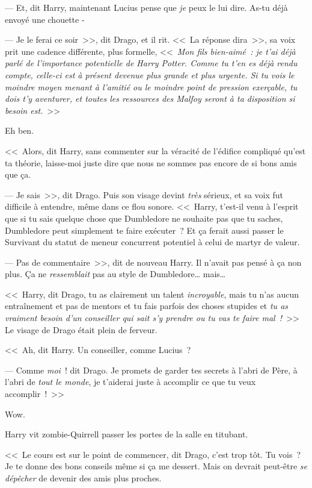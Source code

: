 --- Et, dit Harry, maintenant Lucius pense que \emph{je} peux le lui dire. As-tu déjà envoyé une chouette -

--- Je le ferai ce soir~>>, dit Drago, et il rit. <<~La réponse dira~>>, sa voix prit une cadence différente, plus formelle, <<~\emph{Mon fils bien-aimé~: je t'ai déjà parlé de l'importance potentielle de Harry Potter. Comme tu t'en es déjà rendu compte, celle-ci est à présent devenue plus grande et plus urgente. Si tu vois le moindre moyen menant à l'amitié ou le moindre point de pression exerçable, tu dois t'y aventurer, et toutes les ressources des Malfoy seront à ta disposition si besoin est.}~>>

Eh ben.

<<~Alors, dit Harry, sans commenter sur la véracité de l'édifice compliqué qu'est ta théorie, laisse-moi juste dire que nous ne sommes pas encore de si bons amis que ça.

--- Je sais~>>, dit Drago. Puis son visage devint \emph{très} sérieux, et sa voix fut difficile à entendre, même dans ce flou sonore. <<~Harry, t'est-il venu à l'esprit que si tu sais quelque chose que Dumbledore ne souhaite pas que tu saches, Dumbledore peut simplement te faire exécuter~? Et ça ferait aussi passer le Survivant du statut de meneur concurrent potentiel à celui de martyr de valeur.

--- Pas de commentaire~>>, dit de nouveau Harry. Il n'avait pas pensé à ça non plus. Ça ne \emph{ressemblait} pas au style de Dumbledore… mais…

<<~Harry, dit Drago, tu as clairement un talent \emph{incroyable}, mais tu n'as aucun entraînement et pas de mentors et tu fais parfois des choses stupides et \emph{tu as vraiment besoin d'un conseiller qui sait s'y prendre ou tu vas te faire mal~!}~>> Le visage de Drago était plein de ferveur.

<<~Ah, dit Harry. Un conseiller, comme Lucius~?

--- Comme \emph{moi}~! dit Drago. Je promets de garder tes secrets à l'abri de Père, à l'abri de \emph{tout le monde}, je t'aiderai juste à accomplir ce que tu veux accomplir~!~>>

Wow.

Harry vit zombie-Quirrell passer les portes de la salle en titubant.

<<~Le cours est sur le point de commencer, dit Drago, c'est trop tôt. Tu vois~? Je te donne des bons conseils même si ça me dessert. Mais on devrait peut-être \emph{se dépêcher} de devenir des amis plus proches.

